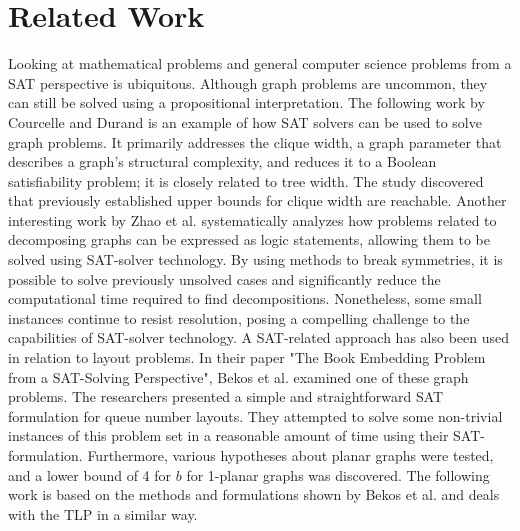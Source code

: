 \documentclass[bachelor, english]{algothesis}
\begin{document}
\section{Related Work}
Looking at mathematical problems and general computer science problems from a SAT perspective is ubiquitous. Although graph problems are uncommon, they can still be solved using a propositional interpretation. The following work by Courcelle and Durand \cite{courcelle:hal-03668884} is an example of how SAT solvers can be used to solve graph problems. It primarily addresses the clique width, a graph parameter that describes a graph's structural complexity, and reduces it to a Boolean satisfiability problem; it is closely related to tree width. The study discovered that previously established upper bounds for clique width are reachable. 
\newline
Another interesting work by Zhao et al. \cite{decomposing} systematically analyzes how problems related to decomposing graphs can be expressed as logic statements, allowing them to be solved using SAT-solver technology. By using methods to break symmetries, it is possible to solve previously unsolved cases and significantly reduce the computational time required to find decompositions. Nonetheless, some small instances continue to resist resolution, posing a compelling challenge to the capabilities of SAT-solver technology.
\newline 
A SAT-related approach has also been used in relation to layout problems.
In their paper "The Book Embedding Problem from a SAT-Solving Perspective", Bekos et al. \cite{book_embedding_sat} examined one of these graph problems. The researchers presented a simple and straightforward SAT formulation for queue number layouts. They attempted to solve some non-trivial instances of this problem set in a reasonable amount of time using their SAT-formulation. Furthermore, various hypotheses about planar graphs were tested, and a lower bound of 4 for $b$ for 1-planar graphs was discovered. The following work is based on the methods and formulations shown by Bekos et al. and deals with the TLP in a similar way.
\end{document}
